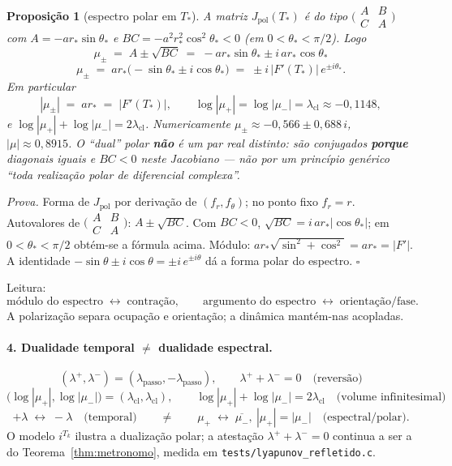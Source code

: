 \documentclass[11pt,a4paper]{article}
\newtheorem{proposicao}{Proposição}
\newcommand{\code}[1]{\texttt{#1}}
\begin{document}
\begin{proposicao}[espectro polar em $T_{\ast}$]\label{prop:J-polar}
A matriz $J_{\mathrm{pol}}(T_{\ast})$ é do tipo
$\bigl(\begin{smallmatrix}A&B\\C&A\end{smallmatrix}\bigr)$ com
$A=-a r_{\ast}\sin\theta_{\ast}$ e
$BC=-a^{2}r_{\ast}^{2}\cos^{2}\theta_{\ast}<0$ (em
$0<\theta_{\ast}<\pi/2$). Logo
\[
\boxed{
\mu_{\pm}
\;=\;
A\pm\sqrt{BC}
\;=\;
-a r_{\ast}\sin\theta_{\ast}
\pm i\, a r_{\ast}\cos\theta_{\ast}
}
\]
\[
\boxed{
\mu_{\pm}
\;=\;
a r_{\ast}\bigl(-\sin\theta_{\ast}\pm i\cos\theta_{\ast}\bigr)
\;=\;
\pm i\,|F'(T_{\ast})|\,e^{\pm i\theta_{\ast}}.
}
\]
Em particular
\[
\boxed{|\mu_{\pm}| \;=\; a r_{\ast} \;=\; |F'(T_{\ast})|},
\qquad
\boxed{
\log|\mu_{+}|=\log|\mu_{-}|=\lambda_{\mathrm{cl}}\approx-0{,}1148
},
\]
e $\log|\mu_{+}|+\log|\mu_{-}|=2\lambda_{\mathrm{cl}}$. Numericamente
$\mu_{\pm}\approx-0{,}566\pm0{,}688\,i$, $|\mu|\approx0{,}8915$.
O ``dual'' polar \textbf{não} é um par real distinto: são conjugados
\textbf{porque} diagonais iguais e $BC<0$ neste Jacobiano --- não por
um princípio genérico ``toda realização polar de diferencial complexa''.
\end{proposicao}

\emph{Prova.} Forma de $J_{\mathrm{pol}}$ por derivação de
$(f_r,f_{\theta})$; no ponto fixo $f_r=r$. Autovalores de
$\bigl(\begin{smallmatrix}A&B\\C&A\end{smallmatrix}\bigr)$:
$A\pm\sqrt{BC}$. Com $BC<0$, $\sqrt{BC}=i\,a r_{\ast}|\cos\theta_{\ast}|$;
em $0<\theta_{\ast}<\pi/2$ obtém-se a fórmula acima. Módulo:
$a r_{\ast}\sqrt{\sin^{2}+\cos^{2}}=a r_{\ast}=|F'|$. A identidade
$-\sin\theta\pm i\cos\theta=\pm i\,e^{\pm i\theta}$ dá a forma polar do
espectro. $\square$

\noindent Leitura:
\[
\boxed{
\text{módulo do espectro}\;\longleftrightarrow\;\text{contração},
\qquad
\text{argumento do espectro}\;\longleftrightarrow\;\text{orientação/fase}.
}
\]
A polarização separa ocupação e orientação; a dinâmica mantém-nas
acopladas.

\paragraph{4. Dualidade temporal $\neq$ dualidade espectral.}
\[
\boxed{
(\lambda^{+},\lambda^{-})=(\lambda_{\mathrm{passo}},-\lambda_{\mathrm{passo}}),
\qquad
\lambda^{+}+\lambda^{-}=0
\quad\text{(reversão)}
}
\]
\[
\boxed{
\bigl(\log|\mu_{+}|,\log|\mu_{-}|\bigr)=(\lambda_{\mathrm{cl}},\lambda_{\mathrm{cl}}),
\qquad
\log|\mu_{+}|+\log|\mu_{-}|=2\lambda_{\mathrm{cl}}
\quad\text{(volume infinitesimal)}
}
\]
\[
\boxed{
+\lambda\;\leftrightarrow\;-\lambda
\quad\text{(temporal)}
\qquad\neq\qquad
\mu_{+}\;\leftrightarrow\;\overline{\mu_{-}},\ |\mu_{+}|=|\mu_{-}|
\quad\text{(espectral/polar)}.
}
\]
O modelo $i^{T_k}$ ilustra a dualização polar; a atestação
$\lambda^{+}+\lambda^{-}=0$ continua a ser a do Teorema~\ref{thm:metronomo},
medida em \code{tests/lyapunov\_refletido.c}.
\end{document}
